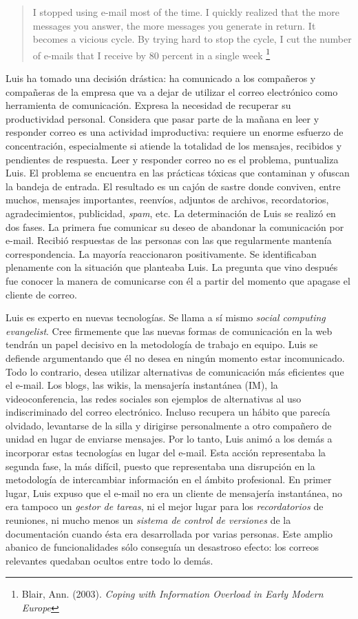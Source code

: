 \documentclass[12pt, a4paper,twoside]{book}
\begin{document}
\begin{quote}
I stopped using e-mail most of the time. I quickly realized that
the more messages you answer, the more messages you generate in
return. It becomes a vicious cycle. By trying hard to stop the
cycle, I cut the number of e-mails that I receive by 80 percent in
a single week%
\footnote{Blair, Ann. (2003).
\emph{Coping with Information Overload in Early Modern Europe}}

\end{quote}
Luis ha tomado una decisión drástica: ha comunicado a los
compañeros y compañeras de la empresa que va a dejar de utilizar el
correo electrónico como herramienta de comunicación. Expresa la
necesidad de recuperar su productividad personal. Considera que
pasar parte de la mañana en leer y responder correo es una
actividad improductiva: requiere un enorme esfuerzo de
concentración, especialmente si atiende la totalidad de los
mensajes, recibidos y pendientes de respuesta. Leer y responder
correo no es el problema, puntualiza Luis. El problema se encuentra
en las prácticas tóxicas que contaminan y ofuscan la bandeja de
entrada. El resultado es un cajón de sastre donde conviven, entre
muchos, mensajes importantes, reenvíos, adjuntos de archivos,
recordatorios, agradecimientos, publicidad, \emph{spam}, etc. La
determinación de Luis se realizó en dos fases. La primera fue
comunicar su deseo de abandonar la comunicación por e-mail. Recibió
respuestas de las personas con las que regularmente mantenía
correspondencia. La mayoría reaccionaron positivamente. Se
identificaban plenamente con la situación que planteaba Luis. La
pregunta que vino después fue conocer la manera de comunicarse con
él a partir del momento que apagase el cliente de correo.

Luis es experto en nuevas tecnologías. Se llama a sí mismo
\emph{social computing evangelist}. Cree firmemente que las nuevas
formas de comunicación en la web tendrán un papel decisivo en la
metodología de trabajo en equipo. Luis se defiende argumentando que
él no desea en ningún momento estar incomunicado. Todo lo
contrario, desea utilizar alternativas de comunicación más
eficientes que el e-mail. Los blogs, las wikis, la mensajería
instantánea (IM), la videoconferencia, las redes sociales son
ejemplos de alternativas al uso indiscriminado del correo
electrónico. Incluso recupera un hábito que parecía olvidado,
levantarse de la silla y dirigirse personalmente a otro compañero
de unidad en lugar de enviarse mensajes. Por lo tanto, Luis animó a
los demás a incorporar estas tecnologías en lugar del e-mail. Esta
acción representaba la segunda fase, la más difícil, puesto que
representaba una disrupción en la metodología de intercambiar
información en el ámbito profesional. En primer lugar, Luis expuso
que el e-mail no era un cliente de mensajería instantánea, no era
tampoco un \emph{gestor de tareas}, ni el mejor lugar para los
\emph{recordatorios} de reuniones, ni mucho menos un
\emph{sistema de control de versiones} de la documentación cuando
ésta era desarrollada por varias personas. Este amplio abanico de
funcionalidades sólo conseguía un desastroso efecto: los correos
relevantes quedaban ocultos entre todo lo demás.
\end{document}
